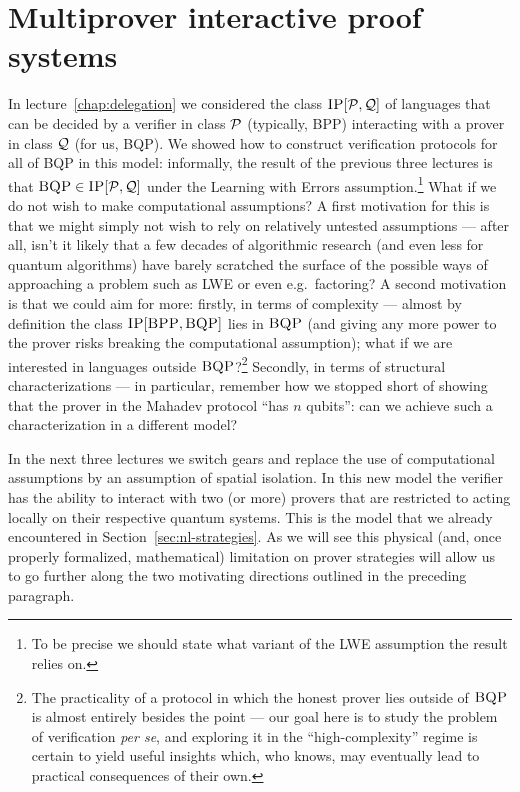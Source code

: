 \chapter{Multiprover interactive proof systems}

In lecture~\ref{chap:delegation} we considered the class $\textsc{IP}[\mathcal{P},\mathcal{Q}]$ of languages that can be decided by a verifier in class $\mathcal{P}$ (typically, BPP) interacting with a prover in class $\mathcal{Q}$ (for us, BQP). We showed how to construct  verification protocols for all of BQP in this model: informally, the result of the previous three lectures is that $\textsc{BQP} \in \textsc{IP}[\mathcal{P},\mathcal{Q}]$ under the Learning with Errors assumption.\footnote{To be precise we should state what variant of the LWE assumption the result relies on.} What if we do not wish to make computational assumptions? A first motivation for this is that we might simply not wish to rely on relatively untested assumptions --- after all, isn't it likely that a few decades of algorithmic research (and even less for quantum algorithms) have barely scratched the surface of the possible ways of approaching a problem such as LWE or even e.g.\ factoring? A second motivation is that we could aim for more: firstly, in terms of complexity --- almost by definition the class $\textsc{IP}[\textsc{BPP},\textsc{BQP}]$ lies in $\textsc{BQP}$ (and giving any more power to the prover risks breaking the computational assumption); what if we are interested in languages outside $\textsc{BQP}$?\footnote{The practicality of a protocol in which the honest prover lies outside of $\textsc{BQP}$ is almost entirely besides the point --- our goal here is to study the problem of verification \emph{per se}, and exploring it in the ``high-complexity'' regime is certain to yield useful insights which, who knows, may eventually lead to practical consequences of their own.}
 Secondly, in terms of structural characterizations --- in particular, remember how we stopped short of showing that the prover in the Mahadev protocol ``has $n$ qubits'': can we achieve such a characterization in a different model? 

In the next three lectures we switch gears and replace the use of computational assumptions by an assumption of spatial isolation. In this new model the verifier has the ability to interact with two (or more) provers that are restricted to acting locally on their respective quantum systems. This is the model that we already encountered in Section~\ref{sec:nl-strategies}. As we will see this  physical (and, once properly formalized, mathematical) limitation on prover strategies will allow us to go further along the two motivating directions outlined in the preceding paragraph. 

